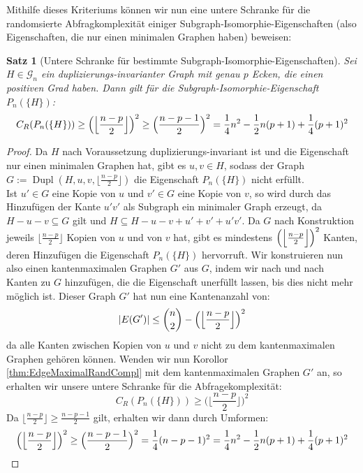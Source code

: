 \documentclass[a4paper]{scrreprt}
\newtheorem{Satz}[definition]{Satz}
\theoremstyle{definition}
\DeclareMathOperator\Dupl{Dupl}
\begin{document}
Mithilfe dieses Kriteriums können wir nun eine
untere Schranke für die randomsierte Abfragkomplexität
einiger Subgraph-Isomorphie-Eigenschaften (also Eigenschaften,
die nur einen minimalen Graphen haben) beweisen:
\begin{Satz}
[Untere Schranke für bestimmte Subgraph-Isomorphie-Eigenschaften]
\label{thm:SubgraphIsomorphismLowerBound}
Sei $H\in \mathcal{G}_n$ ein duplizierungs-invarianter Graph
mit genau $p$ Ecken, die einen positiven Grad haben.
Dann gilt für die Subgraph-Isomorphie-Eigenschaft $P_n(\{H\})$:
$$ C_R(P_n(\{H\})) \geq 
\Big{ ( } \Big \lfloor  \frac{n-p}{2} \Big \rfloor \Big{)}^{2} \geq
\Big ( \frac{n-p-1}{2} \Big ) ^2 =
\frac{1}{4}n^2 - \frac{1}{2}n(p+1) + \frac{1}{4}(p+1)^2
$$
\end{Satz}
\begin{proof}
Da $H$ nach Voraussetzung duplizierungs-invariant ist und die 
Eigenschaft nur einen minimalen Graphen hat, gibt es
$u,v \in H$, sodass der Graph 
$G:= \Dupl(H, u, v, \big \lfloor \frac{n-p}{2} \big \rfloor)$
die Eigenschaft $P_n(\{H\})$ nicht erfüllt. \\
Ist $u'\in G$ eine Kopie von $u$ und $v' \in G$ eine Kopie von $v$,
so wird durch das Hinzufügen der Kante $u'v'$ als Subgraph ein
minimaler Graph erzeugt, da $H-u-v \subseteq G$ gilt und
$H \subseteq H-u-v + u' + v' + u'v'$. Da $G$ nach Konstruktion
jeweils $\big \lfloor \frac{n-p}{2} \big \rfloor$ Kopien von
$u$ und von $v$ hat, gibt es mindestens
$\Big{ ( } \Big \lfloor  \frac{n-p}{2} \Big \rfloor \Big{)}^{2}$
Kanten, deren Hinzufügen die Eigenschaft $P_n(\{H\})$ hervorruft.
Wir konstruieren nun also einen kantenmaximalen Graphen $G'$ aus
$G$, indem wir nach und nach Kanten zu $G$ hinzufügen, die die
Eigenschaft unerfüllt lassen, bis dies nicht mehr möglich ist.
Dieser Graph $G'$ hat nun eine Kantenanzahl von:
$$ |E(G')| \leq \binom{n}{2} - 
\Big ( \Big \lfloor  \frac{n-p}{2} \Big \rfloor \Big{)}^{2} $$
da alle Kanten zwischen Kopien von $u$ und $v$ nicht zu dem
kantenmaximalen Graphen gehören können. Wenden wir nun
Korollor \ref{thm:EdgeMaximalRandCompl} mit dem kantenmaximalen
Graphen $G'$ an, so erhalten wir unsere untere Schranke für
die Abfragekomplexität:
$$ C_R(P_n(\{H\})) \geq 
\Big (  \Big \lfloor  \frac{n-p}{2} \Big \rfloor \Big )^2$$
Da $\Big \lfloor  \frac{n-p}{2} \Big \rfloor \geq \frac{n-p-1}{2}$
gilt, erhalten wir dann durch Umformen:
$$ \Big ( \Big \lfloor  \frac{n-p}{2} \Big \rfloor \Big{)}^{2} \geq
\Big ( \frac{n-p-1}{2} \Big ) ^2 =
\frac{1}{4}(n-p-1)^2 =
\frac{1}{4}n^2 - \frac{1}{2}n(p+1) + \frac{1}{4}(p+1)^2
$$
\end{proof}
\end{document}
